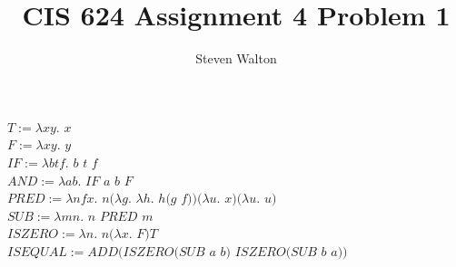 \documentclass[11pt]{article}
\begin{document}
\title{CIS 624 Assignment 4 Problem 1}

\author{Steven Walton}
\maketitle 

\noindent
$T := \lambda xy.$ $x$ \\
$F := \lambda xy.$ $y$ \\
$IF := \lambda btf.$ $b$ $t$ $f$\\
$AND := \lambda ab.$ $IF$ $a$ $b$ $F$\\
$PRED := \lambda nfx.$ $n (\lambda g.$ $\lambda h.$ $h ( g$ $f )) (\lambda u.$ $x) (\lambda u.$ $u)$\\
$SUB := \lambda mn.$ $n$ $PRED$ $m$ \\
$ISZERO := \lambda n.$ $n (\lambda x.$ $F) T$ \\
$ISEQUAL := ADD(ISZERO(SUB$ $a$ $b)$ $ISZERO(SUB$ $b$ $a))$ \\


	
	
	
	
	
	
	
	
\end{document}
